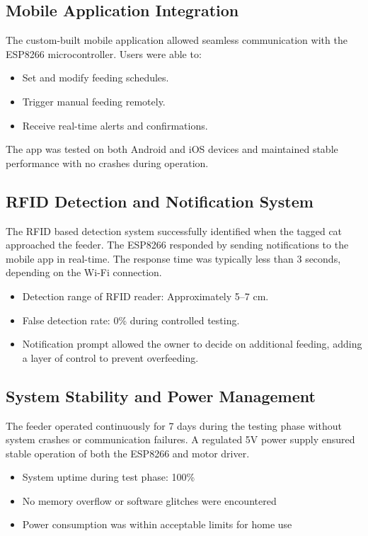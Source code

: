 \documentclass[10pt,a4paper]{extarticle}
\begin{document}
\subsection{Mobile Application Integration}
The custom-built mobile application allowed seamless communication with the ESP8266 microcontroller. Users were able to:
\begin{itemize}[parsep=0em]
    \item Set and modify feeding schedules.
    \item Trigger manual feeding remotely.
    \item Receive real-time alerts and confirmations.
\end{itemize}

The app was tested on both Android and iOS devices and maintained stable performance with no crashes during operation.

\subsection{RFID Detection and Notification System}

The RFID based detection system successfully identified when the tagged cat approached the feeder. The ESP8266 responded by sending notifications to the mobile app in real-time. The response time was typically less than 3 seconds, depending on the Wi-Fi connection.

\begin{itemize}[parsep=0em]
    \item Detection range of RFID reader: Approximately 5–7 cm.
    \item False detection rate: 0\% during controlled testing.
    \item Notification prompt allowed the owner to decide on additional feeding, adding a layer of control to prevent overfeeding.
\end{itemize}

\subsection{System Stability and Power Management}

The feeder operated continuously for 7 days during the testing phase without system crashes or communication failures. A regulated 5V power supply ensured stable operation of both the ESP8266 and motor driver.

\begin{itemize}[parsep=0em]
   \item System uptime during test phase: 100\%
   \item No memory overflow or software glitches were encountered
   \item Power consumption was within acceptable limits for home use
\end{itemize}
\end{document}
